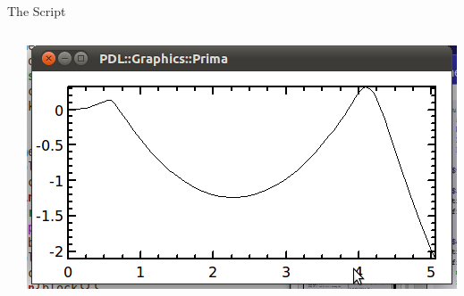 \documentclass[mathserif]{beamer}
\begin{document}
\begin{frame}{The Script}
  \begin{columns}
    \begin{column}{0.49\linewidth}
      \begin{block}{}
        \scriptsize
        
      \end{block}
    \end{column}
    \begin{column}{0.49\linewidth}
      \begin{block}{}
        \scriptsize
        
      \end{block}
      \centering
      \includegraphics[width=0.8\linewidth]{example.png}
    \end{column}
  \end{columns}
\end{frame}
\end{document}
